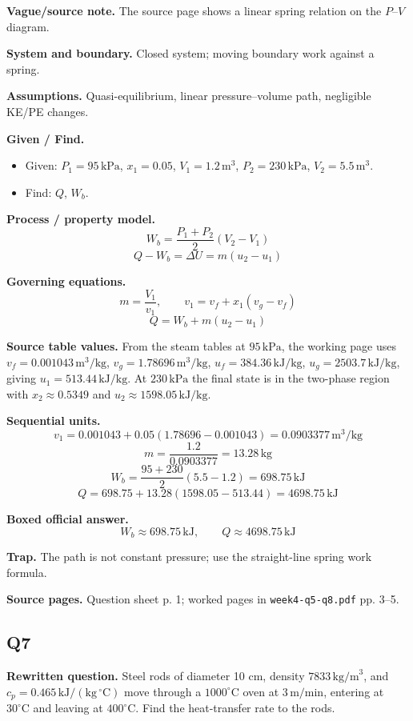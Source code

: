 \textbf{Vague/source note.} The source page shows a linear spring relation on the $P$--$V$ diagram.

\textbf{System and boundary.} Closed system; moving boundary work against a spring.

\textbf{Assumptions.} Quasi-equilibrium, linear pressure--volume path, negligible KE/PE changes.

\textbf{Given / Find.}
\begin{itemize}
  \item Given: $P_1=95\,\text{kPa}$, $x_1=0.05$, $V_1=1.2\,\text{m}^3$, $P_2=230\,\text{kPa}$, $V_2=5.5\,\text{m}^3$.
  \item Find: $Q$, $W_b$.
\end{itemize}

\textbf{Process / property model.}
\[
W_b=\frac{P_1+P_2}{2}(V_2-V_1)
\]
\[
Q-W_b=\Delta U=m(u_2-u_1)
\]

\textbf{Governing equations.}
\[
m=\frac{V_1}{v_1},\qquad v_1=v_f+x_1(v_g-v_f)
\]
\[
Q=W_b+m(u_2-u_1)
\]

\textbf{Source table values.} From the steam tables at $95\,\text{kPa}$, the working page uses $v_f=0.001043\,\text{m}^3/\text{kg}$, $v_g=1.78696\,\text{m}^3/\text{kg}$, $u_f=384.36\,\text{kJ/kg}$, $u_g=2503.7\,\text{kJ/kg}$, giving $u_1=513.44\,\text{kJ/kg}$. At $230\,\text{kPa}$ the final state is in the two-phase region with $x_2\approx 0.5349$ and $u_2\approx 1598.05\,\text{kJ/kg}$.

\textbf{Sequential units.}
\[
v_1=0.001043+0.05(1.78696-0.001043)=0.0903377\,\text{m}^3/\text{kg}
\]
\[
m=\frac{1.2}{0.0903377}=13.28\,\text{kg}
\]
\[
W_b=\frac{95+230}{2}(5.5-1.2)=698.75\,\text{kJ}
\]
\[
Q=698.75+13.28(1598.05-513.44)=4698.75\,\text{kJ}
\]

\textbf{Boxed official answer.}
\[
\boxed{W_b\approx 698.75\,\text{kJ},\qquad Q\approx 4698.75\,\text{kJ}}
\]

\textbf{Trap.} The path is not constant pressure; use the straight-line spring work formula.

\textbf{Source pages.} Question sheet p. 1; worked pages in \texttt{week4-q5-q8.pdf} pp. 3--5.

\subsection*{Q7}
\textbf{Rewritten question.} Steel rods of diameter 10 cm, density $7833\,\text{kg/m}^3$, and $c_p=0.465\,\mathrm{kJ/(kg\,^{\circ}C)}$ move through a $1000^\circ\text{C}$ oven at $3\,\text{m/min}$, entering at $30^\circ\text{C}$ and leaving at $400^\circ\text{C}$. Find the heat-transfer rate to the rods.

